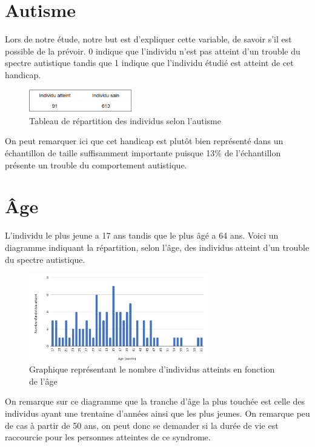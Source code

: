 \documentclass[12,french]{report}
\begin{document}
\section{Autisme}
	Lors de notre étude, notre but est d’expliquer cette variable, de savoir s’il est possible de la prévoir. 0 indique que l’individu n’est pas atteint d’un trouble du spectre autistique tandis que 1 indique que l’individu étudié est atteint de cet handicap.\\
	
\begin{figure}[!ht]
	\center
	\includegraphics[width=0.4\textwidth]{./Images/3}
	\caption{Tableau de répartition des individus selon l'autisme}
\end{figure}\vspace{0.1cm}

On peut remarquer ici que cet handicap est plutôt bien représenté dans un échantillon de taille suffisamment importante puisque 13\% de l’échantillon présente un trouble du comportement autistique.
\section{Âge}
	L’individu le plus jeune a 17 ans tandis que le plus âgé a 64 ans.
Voici un diagramme indiquant la répartition, selon l’âge, des individus atteint d’un trouble du spectre autistique.\\

\begin{figure}[!ht]
	\center
	\includegraphics[width=0.7\textwidth]{./Images/4'}
	\caption{Graphique représentant le nombre d'individus atteints en fonction de l'âge}
\end{figure}\vspace{0.2cm}

	On remarque sur ce diagramme que la tranche d’âge la plus touchée est celle des individus ayant une trentaine d’années ainsi que les plus jeunes. On remarque peu de cas à partir de 50 ans, on peut donc se demander si la durée de vie est raccourcie pour les personnes atteintes de ce syndrome.\\
	
\end{document}
